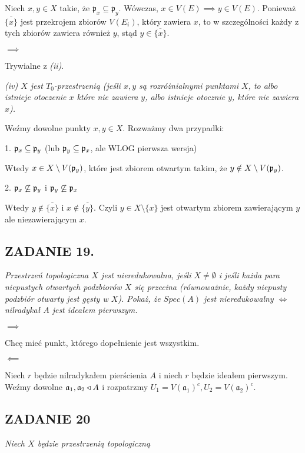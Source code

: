\documentclass{article}
\begin{document}
Niech $x,y\in X$ takie, że $\mathfrak{p}_x\subseteq\mathfrak{p}_y$. Wówczas, $x\in V(E)\implies y\in V(E)$. Ponieważ $\overline{\{x\}}$ jest przekrojem zbiorów $V(E_i)$, który zawiera $x$, to w szczególności każdy z tych zbiorów zawiera również $y$, stąd $y\in\overline{\{x\}}$.

$\implies$

Trywialne z \emph{(ii)}.
\medskip

\emph{\color{pink}(iv) $X$ jest $T_0$-przestrzenią (jeśli $x,y$ są rozróżnialnymi punktami $X$, to albo istnieje otoczenie $x$ które nie zawiera $y$, albo istnieje otocznie $y$, które nie zawiera $x$).}

Weźmy dowolne punkty $x,y\in X$. Rozważmy dwa przypadki:

1. $\mathfrak{p}_x\subseteq\mathfrak{p}_y$ (lub $\mathfrak{p}_y\subseteq\mathfrak{p}_x$, ale WLOG pierwsza wersja)

Wtedy $x\in X\setminus V(\mathfrak{p}_y)$, które jest zbiorem otwartym takim, że $y\notin X\setminus V(\mathfrak{p}_y)$.

2. $\mathfrak{p}_x\not\subseteq\mathfrak{p}_y$ i $\mathfrak{p}_y\not\subseteq\mathfrak{p}_x$

Wtedy $y\notin\overline{\{x\} }$ i $x\notin\overline{\{y\} }$. Czyli $y\in X\setminus\{x\}$ jest otwartym zbiorem zawierającym $y$ ale niezawierającym $x$.

\subsection*{ZADANIE 19.}
\emph{\color{blue}Przestrzeń topologiczna $X$ jest nieredukowalna, jeśli $X\neq\emptyset$ i jeśli każda para niepustych otwartych podzbiorów $X$ się przecina (równoważnie, każdy niepusty podzbiór otwarty jest gęsty w $X$). Pokaż, że $Spec(A)$ jest nieredukowalny $\iff$ nilradykał $A$ jest ideałem pierwszym.}

$\implies$

Chcę mieć punkt, którego dopełnienie jest wszystkim. 

$\impliedby$

Niech $r$ będzie nilradykałem pierścienia $A$ i niech $r$ będzie ideałem pierwszym. Weźmy dowolne $\mathfrak{a}_1,\mathfrak{a}_2\triangleleft A$ i rozpatrzmy $U_1=V(\mathfrak{a}_1)^c,U_2=V(\mathfrak{a}_2)^c$.

\subsection*{ZADANIE 20}
\emph{\color{pink}Niech $X$ będzie przestrzenią topologiczną}
\end{document}
